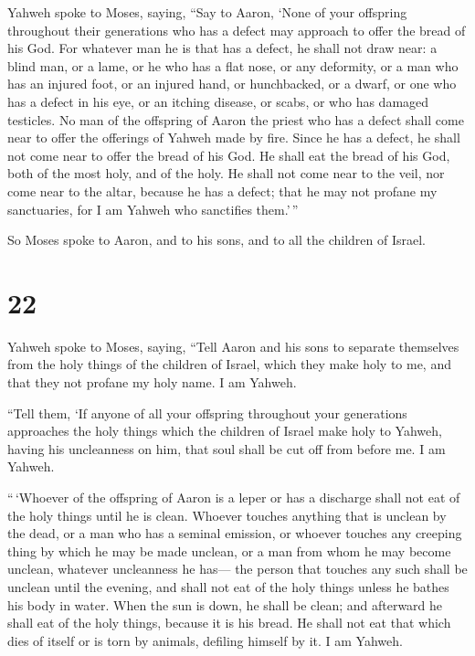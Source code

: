 Yahweh spoke to Moses, saying,  ``Say to
Aaron, `None of your offspring throughout their generations who has a
defect may approach to offer the bread of his God.  For
whatever man he is that has a defect, he shall not draw near: a blind
man, or a lame, or he who has a flat nose, or any deformity,
 or a man who has an injured foot, or an injured hand,
 or hunchbacked, or a dwarf, or one who has a defect in his
eye, or an itching disease, or scabs, or who has damaged testicles.
 No man of the offspring of Aaron the priest who has a
defect shall come near to offer the offerings of Yahweh made by fire.
Since he has a defect, he shall not come near to offer the bread of his
God.  He shall eat the bread of his God, both of the most
holy, and of the holy.  He shall not come near to the veil,
nor come near to the altar, because he has a defect; that he may not
profane my sanctuaries, for I am Yahweh who sanctifies them.'\,''

 So Moses spoke to Aaron, and to his sons, and to all the
children of Israel.

\hypertarget{section-21}{%
\section{22}\label{section-21}}

 Yahweh spoke to Moses, saying,  ``Tell Aaron
and his sons to separate themselves from the holy things of the children
of Israel, which they make holy to me, and that they not profane my holy
name. I am Yahweh.

 ``Tell them, `If anyone of all your offspring throughout
your generations approaches the holy things which the children of Israel
make holy to Yahweh, having his uncleanness on him, that soul shall be
cut off from before me. I am Yahweh.

 ``\,`Whoever of the offspring of Aaron is a leper or has a
discharge shall not eat of the holy things until he is clean. Whoever
touches anything that is unclean by the dead, or a man who has a seminal
emission,  or whoever touches any creeping thing by which he
may be made unclean, or a man from whom he may become unclean, whatever
uncleanness he has---  the person that touches any such
shall be unclean until the evening, and shall not eat of the holy things
unless he bathes his body in water.  When the sun is down,
he shall be clean; and afterward he shall eat of the holy things,
because it is his bread.  He shall not eat that which dies
of itself or is torn by animals, defiling himself by it. I am Yahweh.

